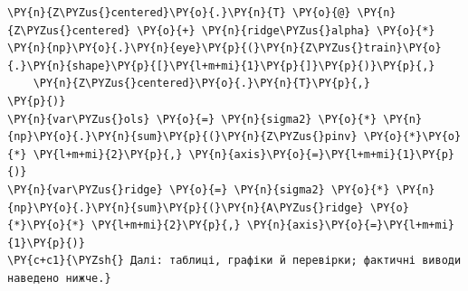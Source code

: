 \begin{Verbatim}[commandchars=\\\{\}]
    \PY{n}{Z\PYZus{}centered}\PY{o}{.}\PY{n}{T} \PY{o}{@} \PY{n}{Z\PYZus{}centered} \PY{o}{+} \PY{n}{ridge\PYZus{}alpha} \PY{o}{*} \PY{n}{np}\PY{o}{.}\PY{n}{eye}\PY{p}{(}\PY{n}{Z\PYZus{}train}\PY{o}{.}\PY{n}{shape}\PY{p}{[}\PY{l+m+mi}{1}\PY{p}{]}\PY{p}{)}\PY{p}{,}
    \PY{n}{Z\PYZus{}centered}\PY{o}{.}\PY{n}{T}\PY{p}{,}
\PY{p}{)}
\PY{n}{var\PYZus{}ols} \PY{o}{=} \PY{n}{sigma2} \PY{o}{*} \PY{n}{np}\PY{o}{.}\PY{n}{sum}\PY{p}{(}\PY{n}{Z\PYZus{}pinv} \PY{o}{*}\PY{o}{*} \PY{l+m+mi}{2}\PY{p}{,} \PY{n}{axis}\PY{o}{=}\PY{l+m+mi}{1}\PY{p}{)}
\PY{n}{var\PYZus{}ridge} \PY{o}{=} \PY{n}{sigma2} \PY{o}{*} \PY{n}{np}\PY{o}{.}\PY{n}{sum}\PY{p}{(}\PY{n}{A\PYZus{}ridge} \PY{o}{*}\PY{o}{*} \PY{l+m+mi}{2}\PY{p}{,} \PY{n}{axis}\PY{o}{=}\PY{l+m+mi}{1}\PY{p}{)}
\PY{c+c1}{\PYZsh{} Далі: таблиці, графіки й перевірки; фактичні виводи наведено нижче.}
\end{Verbatim}
